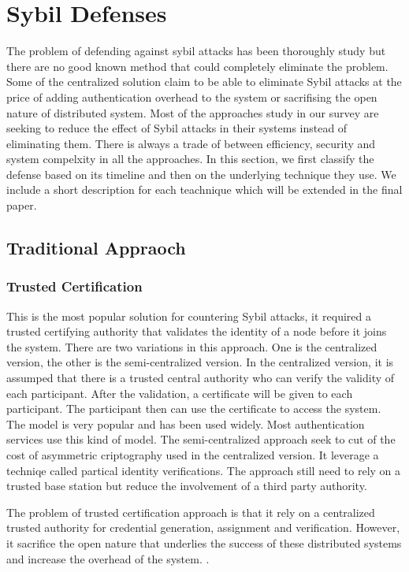 \documentclass[conference]{IEEEtran}
\begin{document}
\section{Sybil Defenses}
The problem of defending against sybil attacks has been thoroughly study but there are no good known method that could completely eliminate the problem. Some of the centralized solution claim to be able to eliminate Sybil attacks at the price of adding authentication overhead to the system or sacrifising the open nature of distributed system. Most of the approaches study in our survey are seeking to reduce the effect of Sybil attacks in their systems instead of eliminating them. There is always a trade of between efficiency, security and system compelxity in all the approaches. In this section, we first classify the defense based on its timeline and then on the underlying technique they use. We include a short description for each teachnique which will be extended in the final paper.

\subsection{Traditional Appraoch}

\subsubsection{Trusted Certification}
This is the most popular solution for countering Sybil attacks, it required a trusted certifying authority that validates the identity of a node before it joins the system. There are two variations in this approach. One is the centralized version, the other is the semi-centralized version. In the centralized version, it is assumped that there is a trusted central authority who can verify the validity of each participant. After the validation, a certificate will be given to each participant. The participant then can use the certificate to access the system. The model is very popular and has been used widely. Most authentication services use this kind of model. The semi-centralized approach seek to cut of the cost of asymmetric criptography used in the centralized version. It leverage a techniqe called partical identity verifications. The approach still need to rely on a trusted base station but reduce the involvement of a third party authority.

The problem of  trusted certification approach is that it rely on a centralized trusted authority for credential generation, assignment and verification. However, it sacrifice the open nature that underlies the success of these distributed systems and increase the overhead of the system. \cite{newsome04sybil}\cite{Castro02Secure}\cite{Adya02FFA}.
\end{document}
